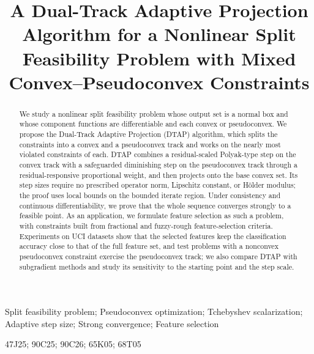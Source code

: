 \documentclass[]{interact}
\theoremstyle{plain}
\theoremstyle{definition}
\theoremstyle{remark}
\begin{document}
\title{A Dual-Track Adaptive Projection Algorithm for a Nonlinear Split Feasibility Problem with Mixed Convex--Pseudoconvex Constraints}

\author{
}

\maketitle

\begin{abstract}
We study a nonlinear split feasibility problem whose output set is a normal box and whose component functions are differentiable and each convex or pseudoconvex. We propose the Dual-Track Adaptive Projection (DTAP) algorithm, which splits the constraints into a convex and a pseudoconvex track and works on the nearly most violated constraints of each. DTAP combines a residual-scaled Polyak-type step on the convex track with a safeguarded diminishing step on the pseudoconvex track through a residual-responsive proportional weight, and then projects onto the base convex set. Its step sizes require no prescribed operator norm, Lipschitz constant, or H\"older modulus; the proof uses local bounds on the bounded iterate region. Under consistency and continuous differentiability, we prove that the whole sequence converges strongly to a feasible point. As an application, we formulate feature selection as such a problem, with constraints built from fractional and fuzzy-rough feature-selection criteria. Experiments on UCI datasets show that the selected features keep the classification accuracy close to that of the full feature set, and test problems with a nonconvex pseudoconvex constraint exercise the pseudoconvex track; we also compare DTAP with subgradient methods and study its sensitivity to the starting point and the step scale.
\end{abstract}

\begin{keywords}
Split feasibility problem; Pseudoconvex optimization; Tchebyshev scalarization; Adaptive step size; Strong convergence; Feature selection
\end{keywords}
\begin{amscode}
47J25; 90C25; 90C26; 65K05; 68T05
\end{amscode}
\end{document}
